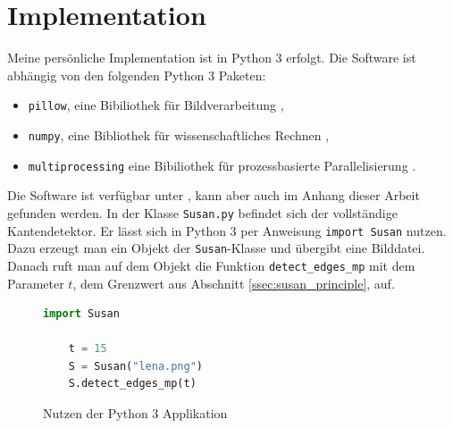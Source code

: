 \documentclass[a4paper, 11pt]{report}
\theoremstyle{definition}
\begin{document}
		\section{Implementation}\label{sec:implementation}
		Meine persönliche Implementation ist in Python 3 erfolgt. Die Software ist abhängig von den folgenden Python 3 Paketen:
		\begin{itemize}
			\item \texttt{pillow}, eine Bibiliothek für Bildverarbeitung \cite{pillow},
			\item \texttt{numpy}, eine Bibliothek für wissenschaftliches Rechnen \cite{numpy},
			\item \texttt{multiprocessing} eine Bibiliothek für prozessbasierte Parallelisierung \cite{multiprocessing}.
		\end{itemize}
		Die Software ist verfügbar unter \cite{mysoftware}, kann aber auch im Anhang dieser Arbeit gefunden werden. In der Klasse \texttt{Susan.py} befindet sich der vollständige Kantendetektor. Er lässt sich in Python 3 per Anweisung \texttt{import Susan} nutzen. Dazu erzeugt man ein Objekt der \texttt{Susan}-Klasse und übergibt eine Bilddatei. Danach ruft man auf dem Objekt die Funktion \texttt{detect\_edges\_mp} mit dem Parameter $t$, dem Grenzwert aus Abschnitt \ref{ssec:susan_principle}, auf.

		\begin{figure}[H] \centering
			\begin{lstlisting}[language=Python]
	import Susan

	t = 15
	S = Susan("lena.png")
	S.detect_edges_mp(t)
			\end{lstlisting}
		\caption{Nutzen der Python 3 Applikation}
		\label{fig:minimal-working-example}
		\end{figure}
\end{document}
